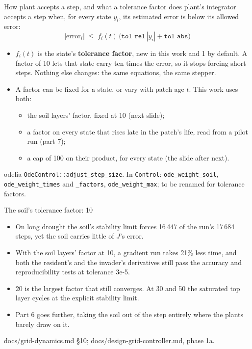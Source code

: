 \documentclass[aspectratio=169,10pt]{beamer}
\newcommand{\src}[1]{\par\vfill{\tiny\color{quiet} #1}}
\begin{document}
\begin{frame}{How plant accepts a step, and what a tolerance factor does}
  \small
  plant's integrator accepts a step when, for every state $y_i$, its estimated error is below
  its allowed error:
  \[
    |\text{error}_i| \;\le\; f_i(t)\,\big(\texttt{tol\_rel}\,|y_i| + \texttt{tol\_abs}\big)
  \]
  \begin{itemize}
    \item $f_i(t)$ is the state's \textbf{tolerance factor}, new in this work and 1 by default.
      A factor of 10 lets that state carry ten times the error, so it stops forcing short
      steps. Nothing else changes: the same equations, the same stepper.
    \item A factor can be fixed for a state, or vary with patch age $t$. This work uses both:
      \begin{itemize}
        \item the soil layers' factor, fixed at 10 (next slide);
        \item a factor on every state that rises late in the patch's life, read from a pilot
          run (part 7);
        \item a cap of 100 on their product, for every state (the slide after next).
      \end{itemize}
  \end{itemize}
  \src{odelia \texttt{OdeControl::adjust\_step\_size}. In \texttt{Control}: \texttt{ode\_weight\_soil},
    \texttt{ode\_weight\_times} and \texttt{\_factors}, \texttt{ode\_weight\_max}; to be renamed for tolerance factors.}
\end{frame}

\begin{frame}{The soil's tolerance factor: 10}
  \small
  \begin{itemize}
    \item On long drought the soil's stability limit forces 16\,447 of the run's 17\,684 steps,
      yet the soil carries little of $J$'s error.
    \item With the soil layers' factor at 10, a gradient run takes 21\% less time, and both the
      resident's and the invader's derivatives still pass the accuracy and reproducibility tests
      at tolerance 3e-5.
    \item 20 is the largest factor that still converges. At 30 and 50 the saturated top layer
      cycles at the explicit stability limit.
    \item Part 6 goes further, taking the soil out of the step entirely where the plants barely
      draw on it.
  \end{itemize}
  \src{docs/grid-dynamics.md \S10; docs/design-grid-controller.md, phase 1a.}
\end{frame}
\end{document}
